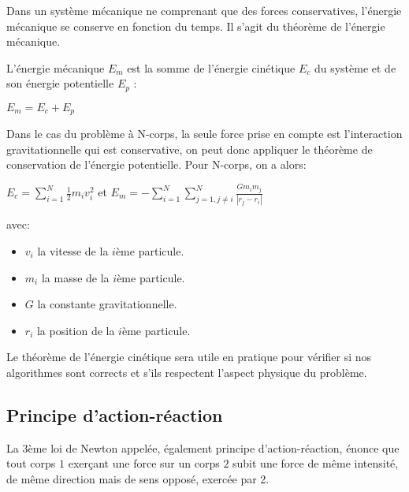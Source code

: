 Dans un système mécanique ne comprenant que des forces conservatives, l'énergie mécanique se conserve en fonction du temps. Il s'agit du théorème de l'énergie mécanique.

L'énergie mécanique $E_m$ est la somme de l'énergie cinétique $E_c$ du système et de son énergie potentielle $E_p$ :

\begin{center}
$E_m = E_c + E_p$
\end{center}

Dans le cas du problème à N-corps, la seule force prise en compte est l'interaction gravitationnelle qui est conservative, on peut donc appliquer le théorème de conservation de l'énergie potentielle. Pour N-corps, on a alors:

\begin{center}
$E_c = \sum\limits_{i=1}^{N} \frac{1}{2}m_i v_i^{2}$  et $E_m =- \sum\limits_{i=1}^{N} \sum\limits_{j=1,j \ne i}^{N} \frac{G m_i m_j}{| r_j - r_i |}$
\end{center}

avec:
\begin{itemize}
\item $v_i$ la vitesse de la $i$ème particule.

\item $m_i$ la masse de la $i$ème particule.

\item $G$ la constante gravitationnelle.

\item $r_i$ la position de la $i$ème particule.

\end{itemize}

\vspace{1mm}
Le théorème de l'énergie cinétique sera utile en pratique pour vérifier si nos algorithmes sont corrects et s'ils respectent l'aspect physique du problème.

\vspace{2mm}
\subsection{Principe d'action-réaction}
\vspace{2mm}

La 3ème loi de Newton appelée, également principe d'action-réaction, énonce que tout corps $1$ exerçant une force sur un corps $2$ subit une force de même intensité, de même direction mais de sens opposé, exercée par 2.

